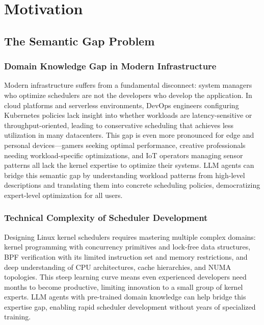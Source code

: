 \section{Motivation}
\label{sec:motivation}

\subsection{The Semantic Gap Problem}

\subsubsection{Domain Knowledge Gap in Modern Infrastructure}

Modern infrastructure suffers from a fundamental disconnect: system managers who optimize schedulers are not the developers who develop the application. In cloud platforms and serverless environments, DevOps engineers configuring Kubernetes policies lack insight into whether workloads are latency-sensitive or throughput-oriented, leading to conservative scheduling that achieves less utilization in many datacenters. This gap is even more pronounced for edge and personal devices—gamers seeking optimal performance, creative professionals needing workload-specific optimizations, and IoT operators managing sensor patterns all lack the kernel expertise to optimize their systems. LLM agents can bridge this semantic gap by understanding workload patterns from high-level descriptions and translating them into concrete scheduling policies, democratizing expert-level optimization for all users.

\subsubsection{Technical Complexity of Scheduler Development}

Designing Linux kernel schedulers requires mastering multiple complex domains: kernel programming with concurrency primitives and lock-free data structures, BPF verification with its limited instruction set and memory restrictions, and deep understanding of CPU architectures, cache hierarchies, and NUMA topologies. This steep learning curve means even experienced developers need months to become productive, limiting innovation to a small group of kernel experts. LLM agents with pre-trained domain knowledge can help bridge this expertise gap, enabling rapid scheduler development without years of specialized training.

